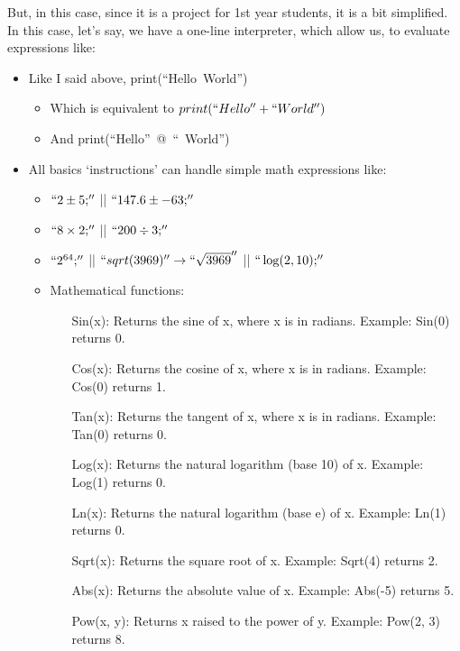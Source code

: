      But, in this case, since it is a project for 1st year students, it is a bit simplified.
     In this case, let's say, we have a one-line interpreter, which allow us, to evaluate expressions like:
     \begin{itemize}
        \item Like I said above, \hbox{print{(``Hello World'')}}
            \begin{itemize}
                \item Which is equivalent to \hbox{$print(``Hello'' + `` World'')$}
                \item And \hbox{print{(``Hello'' @ `` World'')}}
            \end{itemize}
        \item All basics `instructions' can handle simple math expressions like:
            \begin{itemize}
                \item $``2 \pm  5;''$ || $``147.6 \pm  -63;''$
                \item $``8 \times  2;''$ || $``200 \div 3;''$
                \item $``2^{64};''$ || $``sqrt(3969)'' \rightarrow  ``\sqrt{3969}''$ || $``\log(2, 10);''$
                \newpage
                \item Mathematical functions:
                    \begin{itemize}
                        \item[Sin{(x)}:] Returns the sine of x, where x is in radians. Example: Sin{(0)} returns 0.
                        \item[Cos{(x)}:] Returns the cosine of x, where x is in radians. Example: Cos{(0)} returns 1.
                        \item[Tan{(x)}:] Returns the tangent of x, where x is in radians. Example: Tan{(0)} returns 0.
                        \item[Log{(x)}:] Returns the natural logarithm (base 10) of x. Example: Log{(1)} returns 0.
                        \item[Ln{(x)}:] Returns the natural logarithm (base e) of x. Example: Ln{(1)} returns 0.
                        \item[Sqrt{(x)}:] Returns the square root of x. Example: Sqrt{(4)} returns 2.
                        \item[Abs{(x)}:] Returns the absolute value of x. Example: Abs{(-5)} returns 5.
                        \item[Pow{(x, y)}:] Returns x raised to the power of y. Example: Pow{(2, 3)} returns 8.

\end{itemize}
\end{itemize}
\end{itemize}
